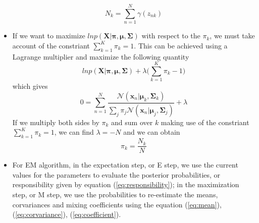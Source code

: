 \documentclass[12pt, a4paper]{article}
\newcommand{\N}{\mathcal{N}}
\begin{document}
\begin{itemize}
\begin{equation}
            N_k=\sum_{n=1}^N\gamma(z_{nk})
        \end{equation}
        \item If we want to maximize $lnp(\mathbf{X}|\bm{\pi},\bm{\mu},\mathbf{\Sigma})$
        with respect to the $\pi_k$, we must take account of the constriant $\sum_{k=1}
        ^K\pi_k=1$. This can be achieved using a Lagrange multiplier and maximize the 
        following quantity
        \begin{equation}
            lnp(\mathbf{X}|\bm{\pi},\bm{\mu},\mathbf{\Sigma})+\lambda\Big(
                \sum_{k=1}^K\pi_k-1\Big)
        \end{equation}
        which gives
        \begin{equation}
            0=\sum_{n=1}^N\frac{\N(\bm{x}_n|\bm{\mu}_k,\mathbf{\Sigma}_k)}
            {\sum_j\pi_j\N(\bm{x}_n|\bm{\mu}_j,\mathbf{\Sigma}_j)}+\lambda
        \end{equation}
        If we multiply both sides by $\pi_k$ and sum over $k$ making use of the 
        constriant $\sum_{k=1}^K\pi_k=1$, we can find $\lambda=-N$ and we can obtain
        \begin{equation}
            \label{eq:coefficient}
            \pi_k=\frac{N_k}{N}
        \end{equation}
        \item For EM algorithm, in the expectation step, or E step, we use the current
        values for the parameters to evaluate the posterior probabilities, or 
        responsibility given by equation (\ref{eq:responsibility}); in the maximization
        step, or M step, we use the probabilities to re-estimate the means, corvariances
        and mixing coefficients using the equation (\ref{eq:mean}), 
        (\ref{eq:corvariance}), (\ref{eq:coefficient}). 
    \end{itemize}
\end{document}

